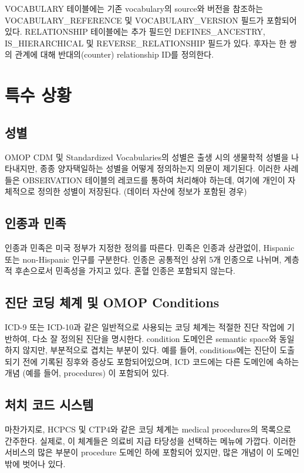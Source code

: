 \documentclass[11pt]{book}
\theoremstyle{definition}
\theoremstyle{definition}
\theoremstyle{definition}
\theoremstyle{remark}
\begin{document}
VOCABULARY 테이블에는 기존 vocabulary의 source와 버전을 참조하는
VOCABULARY\_REFERENCE 및 VOCABULARY\_VERSION 필드가 포함되어 있다.
RELATIONSHIP 테이블에는 추가 필드인 DEFINES\_ANCESTRY, IS\_HIERARCHICAL
및 REVERSE\_RELATIONSHIP 필드가 있다. 후자는 한 쌍의 관계에 대해
반대의(counter) relationship ID를 정의한다.

\section{특수 상황}\label{specialSituations}

\subsection{성별}

OMOP CDM 및 Standardized Vocabularies의 성별은 출생 시의 생물학적 성별을
나타내지만, 종종 양자택일하는 성별을 어떻게 정의하는지 의문이 제기된다.
이러한 사례들은 OBSERVATION 테이블의 레코드를 통하여 처리해야 하는데,
여기에 개인이 자체적으로 정의한 성별이 저장된다. (데이터 자산에 정보가
포함된 경우)

\subsection{인종과 민족}\label{-}

인종과 민족은 미국 정부가 지정한 정의를 따른다. 민족은 인종과 상관없이,
Hispanic 또는 non-Hispanic 인구를 구분한다. 인종은 공통적인 상위 5개
인종으로 나뉘며, 계층적 후손으로서 민족성을 가지고 있다. 혼혈 인종은
포함되지 않는다.

\subsection{진단 코딩 체계 및 OMOP
Conditions}\label{----omop-conditions}

ICD-9 또는 ICD-10과 같은 일반적으로 사용되는 코딩 체계는 적절한 진단
작업에 기반하여, 다소 잘 정의된 진단을 명시한다. condition 도메인은
semantic space와 동일하지 않지만, 부분적으로 겹치는 부분이 있다. 예를
들어, conditions에는 진단이 도출되기 전에 기록된 징후와 증상도
포함되어있으며, ICD 코드에는 다른 도메인에 속하는 개념 (예를 들어,
procedures) 이 포함되어 있다.

\subsection{처치 코드 시스템}\label{--}

마찬가지로, HCPCS 및 CTP4와 같은 코딩 체계는 medical procedures의
목록으로 간주한다. 실제로, 이 체계들은 의료비 지급 타당성을 선택하는
메뉴에 가깝다. 이러한 서비스의 많은 부분이 procedure 도메인 하에
포함되어 있지만, 많은 개념이 이 도메인 밖에 벗어나 있다.
\end{document}
